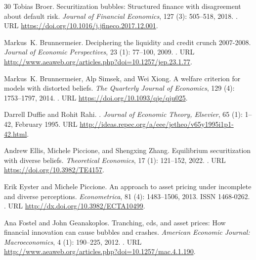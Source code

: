 \documentclass[11pt]{article}
\theoremstyle{plain}
\begin{document}
\begin{thebibliography}{30}
Tobias Broer.
\newblock Securitization bubbles: Structured finance with disagreement about
  default risk.
\newblock \emph{Journal of Financial Economics}, 127 (3):
  505--518, 2018.
\newblock {}.
\newblock URL \url{https://doi.org/10.1016/j.jfineco.2017.12.001}.

Markus~K. Brunnermeier.
\newblock Deciphering the liquidity and credit crunch 2007-2008.
\newblock \emph{Journal of Economic Perspectives}, 23 (1):
  77--100, 2009.
\newblock {}.
\newblock URL \url{http://www.aeaweb.org/articles.php?doi=10.1257/jep.23.1.77}.

Markus~K. Brunnermeier, Alp Simsek, and Wei Xiong.
\newblock A welfare criterion for models with distorted beliefs.
\newblock \emph{The Quarterly Journal of Economics}, 129 (4):
  1753--1797, 2014.
\newblock {}.
\newblock URL \url{https://doi.org/10.1093/qje/qju025}.

Darrell Duffie and Rohit Rahi.
.
\newblock \emph{Journal of Economic Theory, Elsevier}, 65
  (1): 1--42, February 1995.
\newblock URL \url{http://ideas.repec.org/a/eee/jetheo/v65y1995i1p1-42.html}.

Andrew Ellis, Michele Piccione, and Shengxing Zhang.
\newblock Equilibrium securitization with diverse beliefs.
\newblock \emph{Theoretical Economics}, 17 (1): 121--152,
  2022.
\newblock {}.
\newblock URL \url{https://doi.org/10.3982/TE4157}.

Erik Eyster and Michele Piccione.
\newblock An approach to asset pricing under incomplete and diverse
  perceptions.
\newblock \emph{Econometrica}, 81 (4): 1483--1506, 2013.
\newblock ISSN 1468-0262.
\newblock {}.
\newblock URL \url{http://dx.doi.org/10.3982/ECTA10499}.

Ana Fostel and John Geanakoplos.
\newblock Tranching, cds, and asset prices: How financial innovation can cause
  bubbles and crashes.
\newblock \emph{American Economic Journal: Macroeconomics}, 4
  (1): 190--225, 2012.
\newblock {}.
\newblock URL \url{http://www.aeaweb.org/articles.php?doi=10.1257/mac.4.1.190}.


\end{thebibliography}
\end{document}
